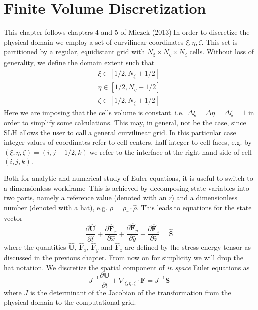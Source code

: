 \section{Finite Volume Discretization}
This chapter follows chapters 4 and 5 of Miczek (2013)
In order to discretize the physical domain we employ a set of curvilinear coordinates $\xi, \eta, \zeta$. This set is partitioned by a regular, equidistant grid with $N_{\xi} \times N_{\eta} \times N_{\zeta}$ cells. Without loss of generality, we define the domain extent such that
\begin{equation}
\begin{split}
\xi \in [1/2, N_{\xi} + 1/2] \\
\eta \in [1/2, N_{\eta} + 1/2] \\
\zeta \in [1/2, N_{\zeta} + 1/2] 
\end{split}
\end{equation}
Here we are imposing that the cells volume is constant, i.e.\ $\Delta \xi = \Delta \eta = \Delta \zeta = 1$ in order to simplify some calculations. This may, in general, not be the case, since SLH allows the user to call a general curvilinear grid. In this particular case integer values of coordinates refer to cell centers, half integer to cell faces, e.g. by $(\xi, \eta, \zeta) = (i, j + 1/2, k)$ we refer to the interface at the right-hand side of cell $(i, j, k)$.

Both for analytic and numerical study of Euler equations, it is useful to switch to a dimensionless workframe. This is achieved by decomposing state variables into two parts, namely a reference value (denoted with an $r$) and a dimensionless number (denoted with a hat), e.g. $\rho = \rho_r \cdot \hat{\rho}$. This leads to equations for the state vector 
\begin{equation}
\frac{\partial \mathbf{\hat{U}}}{\partial \hat{t}} + \frac{\partial \mathbf{\hat{F}}_x}{\partial \hat{x}} + \frac{\partial \mathbf{\hat{F}}_y}{\partial \hat{y}} + \frac{\partial \mathbf{\hat{F}}_z}{\partial \hat{z}} = \mathbf{\hat{S}}
\end{equation}
where the quantities $\mathbf{\hat{U}}$, $\mathbf{\hat{F}}_x$, $\mathbf{\hat{F}}_y$ and $\mathbf{\hat{F}}_z$ are defined by the stress-energy tensor as discussed in the previous chapter. From now on for simplicity we will drop the hat notation. We discretize the spatial component of \textit{in space} Euler equations as 
\begin{equation}
J^{-1}\frac{\partial \mathbf{U}}{\partial t} + \nabla_{\xi, \eta, \zeta} \cdot \mathbf{F} = J^{-1} \mathbf{S}
\end{equation}
where $J$ is the determinant of the Jacobian of the transformation from the physical domain to the computational grid.

